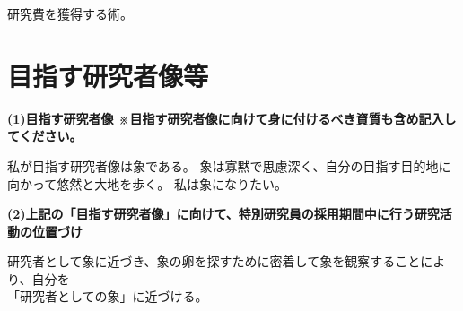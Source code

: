 \documentclass[11pt,a4j,dvipdfmx]{jarticle} 					%
\newcommand{\研究課題名}{象の卵}
\newcommand{\研究機関名}{逢坂大学}
\newcommand{\研究代表者氏名}{湯川秀樹}
\begin{document}
研究費を獲得する術。





\section{目指す研究者像等}

\noindent
\textbf{(1)目指す研究者像 {\footnotesize ※目指す研究者像に向けて身に付けるべき資質も含め記入してください。}}

私が目指す研究者像は象である。
象は寡黙で思慮深く、自分の目指す目的地に向かって悠然と大地を歩く。
私は象になりたい。

\vspace{5mm}
\noindent
\textbf{(2)上記の「目指す研究者像」に向けて、特別研究員の採用期間中に行う研究活動の位置づけ}

研究者として象に近づき、象の卵を探すために密着して象を観察することにより、自分を\\
「研究者としての象」に近づける。



\end{document}
